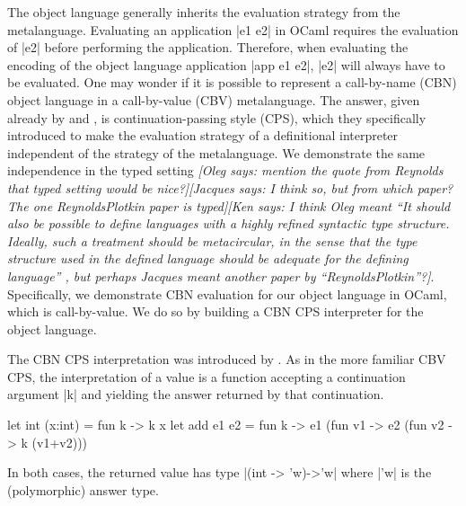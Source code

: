\documentclass[preprint]{sigplanconf}
\newcommand{\jacques}[1]{{\it [Jacques says: #1]}}
\newcommand{\oleg}[1]{{\it [Oleg says: #1]}}
\newcommand{\ccshan}[1]{{\it [Ken says: #1]}}
\begin{document}
The object language generally inherits the evaluation strategy from
the metalanguage. Evaluating an application |e1 e2| in OCaml requires
the evaluation of |e2| before performing the application. Therefore,
when evaluating the encoding of the object language application 
|app e1 e2|, |e2| will always have to be evaluated. One may wonder if it is
possible to represent a call-by-name (CBN) object language in a
call-by-value (CBV) metalanguage. The answer, given already by 
\citet{reynolds-definitional,reynolds-relation} and \citet{PlotkinCBN}, is continuation-passing style (CPS), which they
specifically introduced 
to make the evaluation strategy of a definitional interpreter
independent of the strategy of the metalanguage. We demonstrate the
same independence in the typed setting \oleg{mention the quote from
Reynolds that typed setting would be nice?}\jacques{I think so, but from
which paper? The one ReynoldsPlotkin paper is typed}\ccshan{I think Oleg
meant ``It should also be possible to define languages with a highly
 refined syntactic type structure. Ideally, such a treatment should be
 metacircular, in
 the sense that the type structure used in the defined language should be adequate for the
 defining language'' \citep{reynolds-definitional}, but perhaps Jacques
 meant another paper by ``ReynoldsPlotkin''?}. Specifically, we
demonstrate CBN evaluation for our object language in OCaml, which is
call-by-value. We do so by building a CBN CPS interpreter for the object
language.

The CBN CPS interpretation was introduced by \citet{PlotkinCBN}. As in
the more familiar CBV CPS, the interpretation of a value is a function
accepting a continuation argument |k| and yielding the answer
returned by that continuation.
\begin{code}
let int (x:int) = fun k -> k x
let add e1 e2 = 
  fun k -> e1 (fun v1 -> e2 (fun v2 -> k (v1+v2)))
\end{code}
In both cases, the returned value has type 
|(int -> 'w)->'w| where |'w| is the (polymorphic) answer type.
\end{document}
